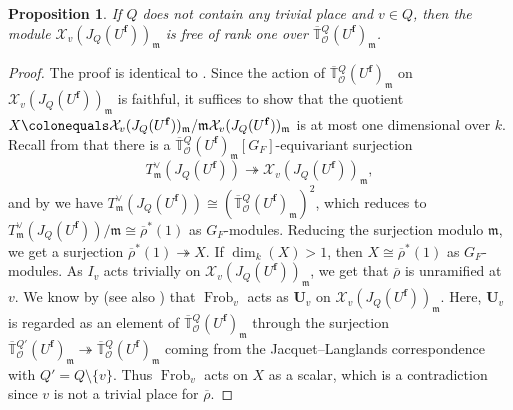 \documentclass[a4paper, notitlepage, 10pt]{amsart}
\theoremstyle{plain} %
\newtheorem{proposition}[theorem]{Proposition}
\theoremstyle{definition} %
\theoremstyle{remark} %
\numberwithin{equation}{section}
\newcommand{\bbT}{\mathbb T}
\newcommand{\Frob}{\operatorname{Frob}} %
\begin{document}
\begin{proposition}\label{freenessofXt}
    If $Q$ does not contain any trivial place and $v\in Q$, then the module $\mathcal{X}_v(J_Q(U^{\mathbf{f}}))_{\mathfrak{m}}$ is free of rank one over $\overline{\bbT}{}^{Q}_{\mathcal{O}}(U^{\mathbf{f}})_{\mathfrak{m}}$.
\end{proposition}
\begin{proof}
    The proof is identical to \cite[Lemma 6.5]{Helm}. Since the action of $\overline{\bbT}{}^{Q}_{\mathcal{O}}(U^{\mathbf{f}})_{\mathfrak{m}}$ on $\mathcal{X}_v(J_Q(U^{\mathbf{f}}))_{\mathfrak{m}}$ is faithful, it suffices to show that the quotient $X\colonequals \mathcal{X}_v(J_Q(U^{\mathbf{f}}))_{\mathfrak{m}}/\mathfrak{m}\mathcal{X}_v(J_Q(U^{\mathbf{f}}))_{\mathfrak{m}}$ is at most one dimensional over $k$. Recall from  that there is a $\overline{\bbT}{}^{Q}_{\mathcal{O}}(U^{\mathbf{f}})_{\mathfrak{m}}[G_F]$-equivariant surjection 
    $$ T^\vee_{\mathfrak{m}}(J_Q(U^{\mathbf{f}}))\twoheadrightarrow \mathcal{X}_v(J_Q(U^{\mathbf{f}}))_{\mathfrak{m}}, $$
     and by  we have $T^\vee_{\mathfrak{m}}(J_Q(U^{\mathbf{f}}))\cong (\overline{\bbT}{}^{Q}_{\mathcal{O}}(U^{\mathbf{f}})_{\mathfrak{m}})^2$, which reduces to $T^\vee_{\mathfrak{m}}(J_Q(U^{\mathbf{f}}))/\mathfrak{m}\cong \overline{\rho}^*(1)$ as $G_F$-modules. Reducing the surjection modulo $\mathfrak{m}$, we get a surjection $\overline{\rho}^*(1)\twoheadrightarrow X$. If $\dim_k(X)>1$, then $X\cong \overline{\rho}^*(1)$ as $G_F$-modules. As $I_v$ acts trivially on $\mathcal{X}_v(J_Q(U^{\mathbf{f}}))_{\mathfrak{m}}$, we get that $\overline{\rho}$ is unramified at $v$. We know by \cite[Théorème (A), \S 5-6]{Car} (see also \cite[Proposition 7]{Raj01}) that $\Frob_{v}$ acts as $\mathbf{U}_{v}$ on $\mathcal{X}_v(J_{Q}(U^{\mathbf{f}}))_{\mathfrak{m}}$. Here, $\mathbf{U}_{v}$ is regarded as an element of $\overline{\bbT}{}^{Q}_{\mathcal{O}}(U^{\mathbf{f}})_{\mathfrak{m}}$ through the surjection $\overline{\bbT}{}^{Q'}_{\mathcal{O}}(U^{\mathbf{f}})_{\mathfrak{m}}\twoheadrightarrow \overline{\bbT}{}^{Q}_{\mathcal{O}}(U^{\mathbf{f}})_{\mathfrak{m}}$ coming from the Jacquet--Langlands correspondence with  $Q'=Q\setminus\{v\}$. Thus $\Frob_v$ acts on $X$ as a scalar, which is a contradiction since $v$ is not a trivial place for $\overline{\rho}$.
\end{proof}
\end{document}
